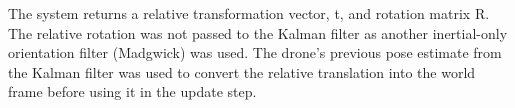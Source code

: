\documentclass[bare_jrnl_transmag]{subfiles}
\begin{document}
The system returns a relative transformation vector, t, and rotation matrix R. The relative rotation was not passed to the Kalman filter as another inertial-only orientation filter (Madgwick) was used. The drone's previous pose estimate from the Kalman filter was used to convert the relative translation into the world frame before using it in the update step.
\end{document}

